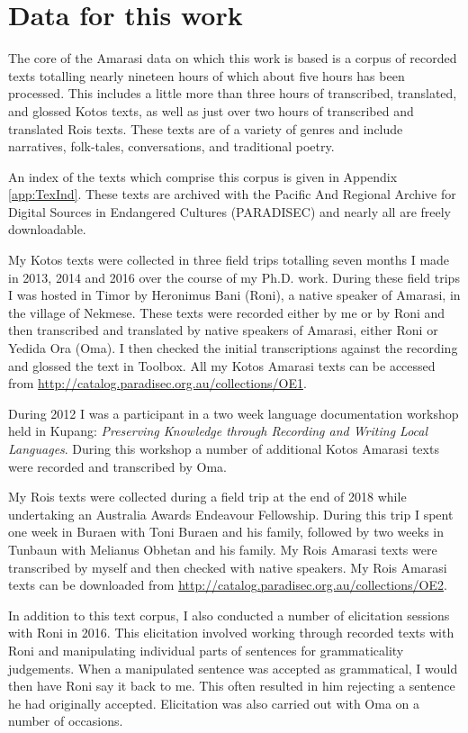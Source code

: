 \section{Data for this work}\label{sec:Meth}
The core of the Amarasi data on which this work is based
is a corpus of recorded texts totalling nearly nineteen hours
of which about five hours has been processed.
This includes a little more than three hours of
transcribed, translated, and glossed Kotos texts,
as well as just over two hours of transcribed and translated Ro{\Q}is texts.
These texts are of a variety of genres and include narratives, folk-tales,
conversations, and traditional poetry.

An index of the texts which comprise this corpus is given in Appendix \ref{app:TexInd}.
These texts are archived with the
Pacific And Regional Archive for Digital Sources in Endangered Cultures (PARADISEC)
and nearly all are freely downloadable.

My Kotos texts were collected in three
field trips totalling seven months I made
in 2013, 2014 and 2016 over the course of my Ph.D. work.
During these field trips I was hosted in Timor by
Heronimus Bani (Roni), a native speaker of Amarasi, in the village of Nekmese{\Q}.
These texts were recorded either by me or by Roni
and then transcribed and translated by native speakers of Amarasi, either Roni or Yedida Ora (Oma).
I then checked the initial transcriptions against the recording and glossed the text in Toolbox.
All my Kotos Amarasi texts can be accessed
from \url{http://catalog.paradisec.org.au/collections/OE1}.

During 2012 I was a participant in a two week
language documentation workshop held in Kupang:
\emph{Preserving Knowledge through Recording and Writing Local Languages}.
During this workshop a number of additional Kotos Amarasi
texts were recorded and transcribed by Oma.

My Ro{\Q}is texts were collected during a
field trip at the end of 2018
while undertaking an Australia Awards Endeavour Fellowship.
During this trip I spent one week in Buraen
with Toni Buraen and his family, followed by
two weeks in Tunbaun with Melianus Obhetan and his family.
My Ro{\Q}is Amarasi texts were transcribed by myself
and then checked with native speakers.
My Ro{\Q}is Amarasi texts can be downloaded from
\url{http://catalog.paradisec.org.au/collections/OE2}.

In addition to this text corpus, I also conducted a number of
elicitation sessions with Roni in 2016.
This elicitation involved working through recorded texts with Roni
and manipulating individual parts of sentences for grammaticality judgements.
When a manipulated sentence was accepted as grammatical,
I would then have Roni say it back to me.
This often resulted in him rejecting a sentence he had originally accepted.
Elicitation was also carried out with Oma on a number of occasions.

